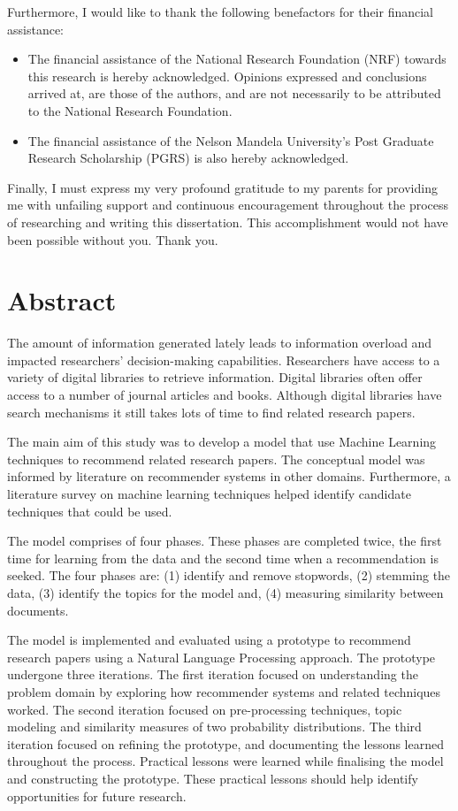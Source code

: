 Furthermore, I would like to thank the following benefactors for their financial assistance:

\begin{itemize}
	\item The financial assistance of the National Research Foundation (NRF) towards this research is hereby acknowledged. Opinions expressed and conclusions arrived at, are those of the authors, and are not necessarily to be attributed to the National Research Foundation.
	\item The financial assistance of the Nelson Mandela University's Post Graduate Research Scholarship (PGRS) is also hereby acknowledged.
\end{itemize}

Finally, I must express my very profound gratitude to my parents for providing me with unfailing support and continuous encouragement throughout the process of researching and writing this dissertation. This accomplishment would not have been possible without you. Thank you.

\chapter{Abstract}
The amount of information generated lately leads to information overload and impacted researchers’ decision-making capabilities. Researchers have access to a variety of digital libraries to retrieve information. Digital libraries often offer access to a number of journal articles and books. Although digital libraries have search mechanisms it still takes lots of time to find related research papers.

The main aim of this study was to develop a model that use Machine Learning techniques to recommend related research papers. The conceptual model was informed by literature on recommender systems in other domains. Furthermore, a literature survey on machine learning techniques helped identify candidate techniques that could be used.

The model comprises of four phases. These phases are completed twice, the first time for learning from the data and the second time when a recommendation is seeked. The four phases are: (1) identify and remove stopwords, (2) stemming the data, (3) identify the topics for the model and, (4) measuring similarity between documents.
 
The model is implemented and evaluated using a prototype to recommend research papers using a Natural Language Processing approach. The prototype undergone three iterations. The first iteration focused on understanding the problem domain by exploring how recommender systems and related techniques worked. The second iteration focused on pre-processing techniques, topic modeling and similarity measures of two probability distributions. The third iteration focused on refining the prototype, and documenting the lessons learned throughout the process. Practical lessons were learned while finalising the model and constructing the prototype. These practical lessons should help identify opportunities for future research.
